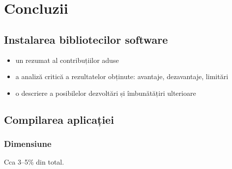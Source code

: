 \chapter{Concluzii}


\section{Instalarea bibliotecilor software}

\begin{itemize}
 \item un rezumat al contribuțiilor aduse
 \item a analiză critică a rezultatelor obținute: avantaje, dezavantaje, limitări
 \item o descriere a posibilelor dezvoltări și îmbunătățiri ulterioare
\end{itemize}


\section{Compilarea aplicației}

\subsection{Dimensiune}

Cca 3--5\% din total.




